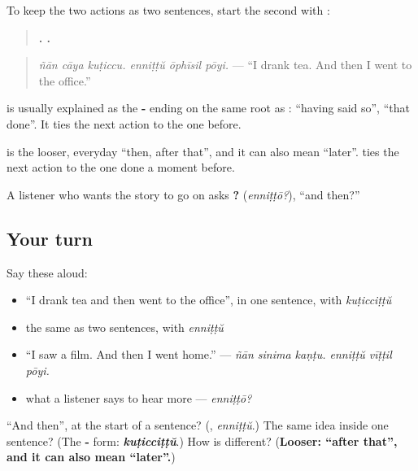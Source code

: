 \begin{grammarlens}[title={Grammar Lens: two sentences, with \ml{എന്നിട്ട്}}]
To keep the two actions as two sentences, start the second with \textbf{}:

\begin{quote}
\textbf{  .   .}
\end{quote}

\begin{quote}
\emph{ñān cāya kuṭiccu. enniṭṭŭ ōphīsil pōyi.} — \textquotedblleft{}I drank tea. And then I went to the office.\textquotedblright{}
\end{quote}

\textbf{} is usually explained as the \textbf{-} ending on the same root as \textbf{}: \textquotedblleft{}having said so\textquotedblright{}, \textquotedblleft{}that done\textquotedblright{}. It ties the next action to the one before.

\textbf{} is the looser, everyday \textquotedblleft{}then, after that\textquotedblright{}, and it can also mean \textquotedblleft{}later\textquotedblright{}. \textbf{} ties the next action to the one done a moment before.

A listener who wants the story to go on asks \textbf{?} (\emph{enniṭṭō?}), \textquotedblleft{}and then?\textquotedblright{}
\end{grammarlens}

\subsection*{Your turn}
Say these aloud:

\begin{itemize}
\raggedright
  \item \textquotedblleft{}I drank tea and then went to the office\textquotedblright{}, in one sentence, with \emph{kuṭicciṭṭŭ}
  \item the same as two sentences, with \emph{enniṭṭŭ}
  \item \textquotedblleft{}I saw a film. And then I went home.\textquotedblright{} — \emph{ñān sinima kaṇṭu. enniṭṭŭ vīṭṭil pōyi.}
  \item what a listener says to hear more — \emph{enniṭṭō?}
\end{itemize}

\begin{tcolorbox}[breakable,colback=teal!4,colframe=teal!35!black,title={Before you move on}]
\textquotedblleft{}And then\textquotedblright{}, at the start of a sentence? (\textbf{}, \emph{enniṭṭŭ}.) The same idea inside one sentence? (The \textbf{-} form: \emph{\textbf{kuṭicciṭṭŭ}}.) How is \textbf{} different? (\textbf{Looser: \textquotedblleft{}after that\textquotedblright{}, and it can also mean \textquotedblleft{}later\textquotedblright{}.})
\end{tcolorbox}
